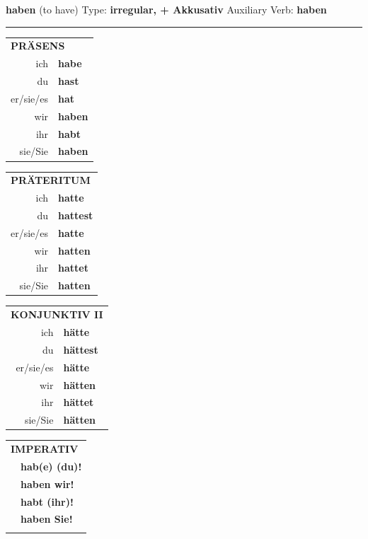 \documentclass[10pt,a4paper]{revtex4-2}
\begin{document}
\begin{verbbox-acc}
    {\Large \bf haben} (to have) \hfill Type: \textbf{irregular, + Akkusativ} \hfill Auxiliary Verb: \textbf{haben} 
     \vspace{5pt}
    \hrule
    \vspace{5pt}
  \begin{tabular}{rl}
     \multicolumn{2}{l}{\textbf{PRÄSENS} }\\
    ich & \textbf{habe}\\
    du & \textbf{hast}\\
    er/sie/es & \textbf{hat}\\
    wir & \textbf{haben}\\
    ihr & \textbf{habt}\\
    sie/Sie & \textbf{haben}\\
  \end{tabular}
  \hfill
     \begin{tabular}{rl}
    \multicolumn{2}{l}{\textbf{PRÄTERITUM} }\\
    ich & \textbf{hatte}\\
    du & \textbf{hattest}\\
    er/sie/es & \textbf{hatte}\\
    wir & \textbf{hatten}\\
    ihr & \textbf{hattet}\\
    sie/Sie & \textbf{hatten}\\
  \end{tabular}
  \hfill
       \begin{tabular}{rl}
    \multicolumn{2}{l}{\textbf{KONJUNKTIV II} }\\
    ich & \textbf{hätte}\\
    du & \textbf{hättest}\\
    er/sie/es & \textbf{hätte}\\
    wir & \textbf{hätten}\\
    ihr & \textbf{hättet}\\
    sie/Sie & \textbf{hätten}\\
  \end{tabular}
  \hfill
  \begin{tabular}{rl}
     \multicolumn{2}{l}{\textbf{IMPERATIV} }\\
   & \textbf{hab(e) (du)!}\\
   & \textbf{haben wir!}\\
   & \textbf{habt (ihr)!}\\
   & \textbf{haben Sie!}\\
   & \vspace{10pt}
  \end{tabular}


\end{verbbox-acc}
\end{document}
